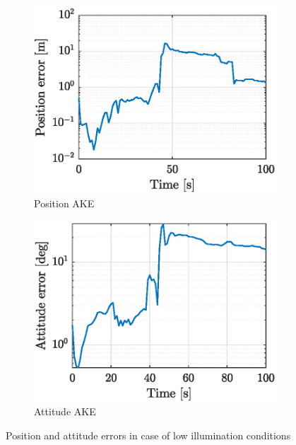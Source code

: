\begin{figure}[!h]
    \begin{subfigure}{0.48\linewidth}
    \centering
    \includegraphics[width = 1\linewidth]{Images/lowillpos.eps}
    \caption{Position AKE}
    \label{fig:lowillpos}
    \end{subfigure}\hfill
    \begin{subfigure}{0.48\linewidth}
    \centering
    \includegraphics[width = 1\linewidth]{Images/lowillatt_corrected.eps}
    \caption{Attitude AKE}
    \label{fig:lowillatt}
    \end{subfigure}
    \caption{Position and attitude errors in case of low illumination conditions}
    \label{fig:lowillerrors}
\end{figure}

